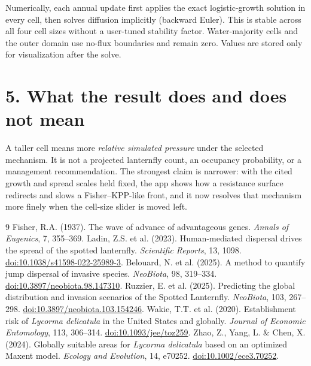 \documentclass[10pt]{article}
\begin{document}
Numerically, each annual update first applies the exact logistic-growth solution in every cell, then solves diffusion implicitly (backward Euler).  This is stable across all four cell sizes without a user-tuned stability factor.  Water-majority cells and the outer domain use no-flux boundaries and remain zero.  Values are stored only for visualization after the solve.

\section*{5. What the result does and does not mean}
A taller cell means more \emph{relative simulated pressure} under the selected mechanism.  It is not a projected lanternfly count, an occupancy probability, or a management recommendation.  The strongest claim is narrower: with the cited growth and spread scales held fixed, the app shows how a resistance surface redirects and slows a Fisher--KPP-like front, and it now resolves that mechanism more finely when the cell-size slider is moved left.

\vspace{-0.3em}
\setlength{\parskip}{0pt}
\begin{thebibliography}{9}\tiny
\setlength{\itemsep}{0pt}
\setlength{\parsep}{0pt}
 Fisher, R.A. (1937). The wave of advance of advantageous genes. \emph{Annals of Eugenics}, 7, 355--369.
 Ladin, Z.S. et al. (2023). Human-mediated dispersal drives the spread of the spotted lanternfly. \emph{Scientific Reports}, 13, 1098. \href{https://doi.org/10.1038/s41598-022-25989-3}{doi:10.1038/s41598-022-25989-3}.
 Belouard, N. et al. (2025). A method to quantify jump dispersal of invasive species. \emph{NeoBiota}, 98, 319--334. \href{https://doi.org/10.3897/neobiota.98.147310}{doi:10.3897/neobiota.98.147310}.
 Ruzzier, E. et al. (2025). Predicting the global distribution and invasion scenarios of the Spotted Lanternfly. \emph{NeoBiota}, 103, 267--298. \href{https://doi.org/10.3897/neobiota.103.154246}{doi:10.3897/neobiota.103.154246}.
 Wakie, T.T. et al. (2020). Establishment risk of \emph{Lycorma delicatula} in the United States and globally. \emph{Journal of Economic Entomology}, 113, 306--314. \href{https://doi.org/10.1093/jee/toz259}{doi:10.1093/jee/toz259}.
 Zhao, Z., Yang, L. \& Chen, X. (2024). Globally suitable areas for \emph{Lycorma delicatula} based on an optimized Maxent model. \emph{Ecology and Evolution}, 14, e70252. \href{https://doi.org/10.1002/ece3.70252}{doi:10.1002/ece3.70252}.
\end{thebibliography}
\end{document}
